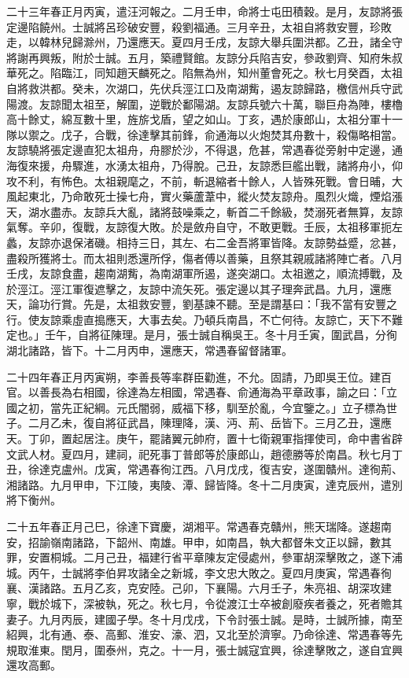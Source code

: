 \begin{pinyinscope}
二十三年春正月丙寅，遣汪河報之。二月壬申，命將士屯田積穀。是月，友諒將張定邊陷饒州。士誠將呂珍破安豐，殺劉福通。三月辛丑，太祖自將救安豐，珍敗走，以韓林兒歸滁州，乃還應天。夏四月壬戌，友諒大舉兵圍洪都。乙丑，諸全守將謝再興叛，附於士誠。五月，築禮賢館。友諒分兵陷吉安，參政劉齊、知府朱叔華死之。陷臨江，同知趙天麟死之。陷無為州，知州董會死之。秋七月癸酉，太祖自將救洪都。癸未，次湖口，先伏兵涇江口及南湖觜，遏友諒歸路，檄信州兵守武陽渡。友諒聞太祖至，解圍，逆戰於鄱陽湖。友諒兵號六十萬，聯巨舟為陣，樓櫓高十餘丈，綿亙數十里，旌旂戈盾，望之如山。丁亥，遇於康郎山，太祖分軍十一隊以禦之。戊子，合戰，徐達擊其前鋒，俞通海以火炮焚其舟數十，殺傷略相當。友諒驍將張定邊直犯太祖舟，舟膠於沙，不得退，危甚，常遇春從旁射中定邊，通海復來援，舟驟進，水湧太祖舟，乃得脫。己丑，友諒悉巨艦出戰，諸將舟小，仰攻不利，有怖色。太祖親麾之，不前，斬退縮者十餘人，人皆殊死戰。會日晡，大風起東北，乃命敢死士操七舟，實火藥蘆葦中，縱火焚友諒舟。風烈火熾，煙焰漲天，湖水盡赤。友諒兵大亂，諸將鼓噪乘之，斬首二千餘級，焚溺死者無算，友諒氣奪。辛卯，復戰，友諒復大敗。於是斂舟自守，不敢更戰。壬辰，太祖移軍扼左蠡，友諒亦退保渚磯。相持三日，其左、右二金吾將軍皆降。友諒勢益蹙，忿甚，盡殺所獲將士。而太祖則悉還所俘，傷者傅以善藥，且祭其親戚諸將陣亡者。八月壬戌，友諒食盡，趨南湖觜，為南湖軍所遏，遂突湖口。太祖邀之，順流搏戰，及於涇江。涇江軍復遮擊之，友諒中流矢死。張定邊以其子理奔武昌。九月，還應天，論功行賞。先是，太祖救安豐，劉基諫不聽。至是謂基曰：「我不當有安豐之行。使友諒乘虛直搗應天，大事去矣。乃頓兵南昌，不亡何待。友諒亡，天下不難定也。」壬午，自將征陳理。是月，張士誠自稱吳王。冬十月壬寅，圍武昌，分徇湖北諸路，皆下。十二月丙申，還應天，常遇春留督諸軍。

二十四年春正月丙寅朔，李善長等率群臣勸進，不允。固請，乃即吳王位。建百官。以善長為右相國，徐達為左相國，常遇春、俞通海為平章政事，諭之曰：「立國之初，當先正紀綱。元氏闇弱，威福下移，馴至於亂，今宜鑒之。」立子標為世子。二月乙未，復自將征武昌，陳理降，漢、沔、荊、岳皆下。三月乙丑，還應天。丁卯，置起居注。庚午，罷諸翼元帥府，置十七衛親軍指揮使司，命中書省辟文武人材。夏四月，建祠，祀死事丁普郎等於康郎山，趙德勝等於南昌。秋七月丁丑，徐達克盧州。戊寅，常遇春徇江西。八月戊戌，復吉安，遂圍贛州。達徇荊、湘諸路。九月甲申，下江陵，夷陵、潭、歸皆降。冬十二月庚寅，達克辰州，遣別將下衡州。

二十五年春正月己巳，徐達下寶慶，湖湘平。常遇春克贛州，熊天瑞降。遂趨南安，招諭嶺南諸路，下韶州、南雄。甲申，如南昌，執大都督朱文正以歸，數其罪，安置桐城。二月己丑，福建行省平章陳友定侵處州，參軍胡深擊敗之，遂下浦城。丙午，士誠將李伯昇攻諸全之新城，李文忠大敗之。夏四月庚寅，常遇春徇襄、漢諸路。五月乙亥，克安陸。己卯，下襄陽。六月壬子，朱亮祖、胡深攻建寧，戰於城下，深被執，死之。秋七月，令從渡江士卒被創廢疾者養之，死者贍其妻子。九月丙辰，建國子學。冬十月戊戌，下令討張士誠。是時，士誠所據，南至紹興，北有通、泰、高郵、淮安、濠、泗，又北至於濟寧。乃命徐達、常遇春等先規取淮東。閏月，圍泰州，克之。十一月，張士誠寇宜興，徐達擊敗之，遂自宜興還攻高郵。


\end{pinyinscope}
